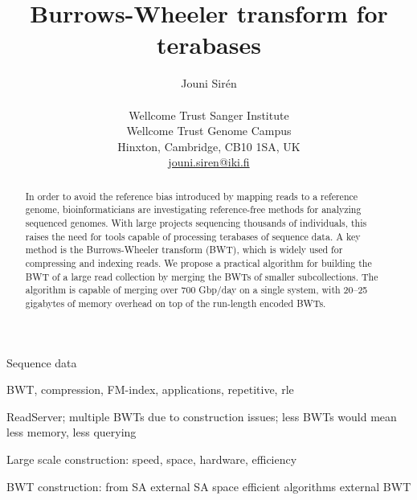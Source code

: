 \documentclass[smallabstract,smallcaptions]{dccpaper}
\begin{document}
\title
{\large
\textbf{Burrows-Wheeler transform for terabases}
}


\author{%
Jouni Sirén \\[0.5em]
{\small\begin{minipage}{\linewidth}\begin{center}
\begin{tabular}{c}
Wellcome Trust Sanger Institute \\
Wellcome Trust Genome Campus \\
Hinxton, Cambridge, CB10 1SA, UK \\
\url{jouni.siren@iki.fi}
\end{tabular}
\end{center}\end{minipage}}
}


\maketitle
\thispagestyle{empty}


\begin{abstract}
In order to avoid the reference bias introduced by mapping reads to a reference genome, bioinformaticians are investigating reference-free methods for analyzing sequenced genomes. With large projects sequencing thousands of individuals, this raises the need for tools capable of processing terabases of sequence data. A key method is the Burrows-Wheeler transform (BWT), which is widely used for compressing and indexing reads. We propose a practical algorithm for building the BWT of a large read collection by merging the BWTs of smaller subcollections. The algorithm is capable of merging over 700 Gbp/day on a single system, with 20--25 gigabytes of memory overhead on top of the run-length encoded BWTs.
\end{abstract}



Sequence data

BWT, compression, FM-index, applications, repetitive, rle

ReadServer; multiple BWTs due to construction issues; less BWTs would mean less memory, less querying

Large scale construction: speed, space, hardware, efficiency

BWT construction: from SA \cite{Mori2008,Nong2011}
external SA \cite{Gonnet1992,Bingmann2013,Kaerkkaeinen2014a,Nong2014,Kaerkkaeinen2015a}
space efficient algorithms \cite{Hon2007,Kaerkkaeinen2007,Siren2009,Okanohara2009}
external BWT \cite{Ferragina2012,Beller2013}
\end{document}
